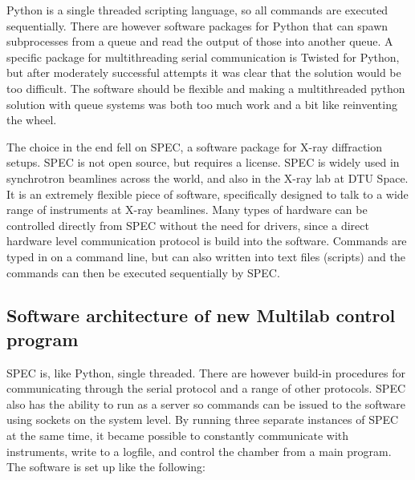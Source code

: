 Python is a single threaded scripting language, so all commands are executed sequentially. There are however software packages for Python that can spawn subprocesses from a queue and read the output of those into another queue. A specific package for multithreading serial communication is Twisted for Python, but after moderately successful attempts it was clear that the solution would be too difficult. The software should be flexible and making a multithreaded python solution with queue systems was both too much work and a bit like reinventing the wheel.

The choice in the end fell on SPEC, a software package for X-ray diffraction setups. SPEC is not open source, but requires a license. SPEC is widely used in synchrotron beamlines across the world, and also in the X-ray lab at DTU Space. It is an extremely flexible piece of software, specifically designed to talk to a wide range of instruments at X-ray beamlines. Many types of hardware can be controlled directly from SPEC without the need for drivers, since a direct hardware level communication protocol is build into the software. Commands are typed in on a command line, but can also written into text files (scripts) and the commands can then be executed sequentially by SPEC.

\subsection{Software architecture of new Multilab control program}
SPEC is, like Python, single threaded. There are however build-in procedures for communicating through the serial protocol and a range of other protocols. SPEC also has the ability to run as a server so commands can be issued to the software using sockets on the system level. By running three separate instances of SPEC at the same time, it became possible to constantly communicate with instruments, write to a logfile, and control the chamber from a main program. The software is set up like the following:

